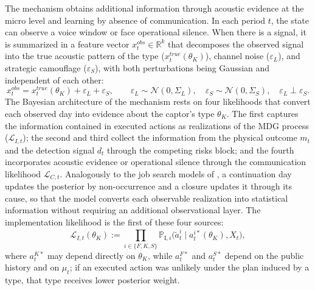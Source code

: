 \documentclass[pdflatex,sn-mathphys-ay]{sn-jnl}
\theoremstyle{plain}
\theoremstyle{definition}
\newcommand{\1}{\mathbf{1}}
\newcommand{\ProbI}[1]{\mathbb{P}_{\mathrm{I},#1}}
\begin{document}
The mechanism obtains additional information through acoustic evidence at the micro level and learning by absence of communication. In each period $t$, the state can observe a voice window or face operational silence. When there is a signal, it is summarized in a feature vector $x_t^{obs}\in\mathbb{R}^k$ that decomposes the observed signal into the true acoustic pattern of the type ($x_t^{true}(\theta_K)$), channel noise ($\varepsilon_L$), and strategic camouflage ($\varepsilon_S$), with both perturbations being Gaussian and independent of each other:
\begin{equation}
x_t^{obs}=x_t^{true}(\theta_K)+\varepsilon_L+\varepsilon_S,\qquad\varepsilon_L\sim\mathcal{N}(0,\Sigma_L),\quad\varepsilon_S\sim\mathcal{N}(0,\Sigma_S),\quad\varepsilon_L\perp\varepsilon_S.
\label{eq:voz-descomp}
\end{equation}
The Bayesian architecture of the mechanism rests on four likelihoods that convert each observed day into evidence about the captor's type $\theta_K$. The first captures the information contained in executed actions as realizations of the MDG process ($\mathcal{L}_{I,t}$); the second and third collect the information from the physical outcome $m_t$ and the detection signal $d_t$ through the competing risks block; and the fourth incorporates acoustic evidence or operational silence through the communication likelihood $\mathcal{L}_{C,t}$. Analogously to the job search models of \citet{McCall1970}, a continuation day updates the posterior by non-occurrence and a closure updates it through its cause, so that the model converts each observable realization into statistical information without requiring an additional observational layer. The implementation likelihood is the first of these four sources:
\begin{equation}
\mathcal{L}_{I,t}(\theta_K):=\prod_{i\in\{F,K,S\}}\ProbI{i}\!\bigl(\tilde{a}_t^i\mid a_t^{i\ast}(\theta_K),X_t\bigr),
\label{eq:LI-atilde}
\end{equation}
where $a_t^{K\ast}$ may depend directly on $\theta_K$, while $a_t^{F\ast}$ and $a_t^{S\ast}$ depend on the public history and on $\mu_t$; if an executed action was unlikely under the plan induced by a type, that type receives lower posterior weight.
\end{document}
